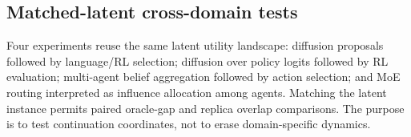 \subsection{Matched-latent cross-domain tests}

Four experiments reuse the same latent utility landscape: diffusion proposals followed by
language/RL selection; diffusion over policy logits followed by RL evaluation; multi-agent
belief aggregation followed by action selection; and MoE routing interpreted as influence
allocation among agents. Matching the latent instance permits paired oracle-gap and replica
overlap comparisons. The purpose is to test continuation coordinates, not to erase
domain-specific dynamics.
